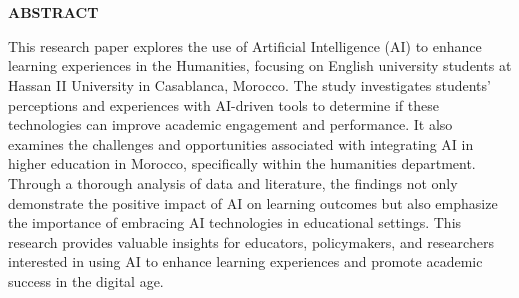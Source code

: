 
\newenvironment{myabstract}
{%
    \thispagestyle{empty}%
    \vspace*{\stretch{2}}%
    \justifying      %
}
{\par %
    \vspace{\stretch{3}} %
    \clearpage           %
}

\chapter*{}
\begin{myabstract}
    \begin{center}
        {\textbf{ABSTRACT}}
    \end{center}
    This research paper explores the use of Artificial Intelligence (AI)
    to enhance learning experiences in the Humanities, focusing on English
    university students at Hassan II University in Casablanca, Morocco.
    The study investigates students’ perceptions and experiences with
    AI-driven tools to determine if these technologies can improve
    academic engagement and performance. It also examines the
    challenges and opportunities associated with integrating AI
    in higher education in Morocco, specifically within the humanities
    department. Through a thorough analysis of data and literature,
    the findings not only demonstrate the positive impact of AI on
    learning outcomes but also emphasize the importance of embracing
    AI technologies in educational settings. This research provides
    valuable insights for educators, policymakers, and researchers
    interested in using AI to enhance learning experiences and
    promote academic success in the digital age.
\end{myabstract}
